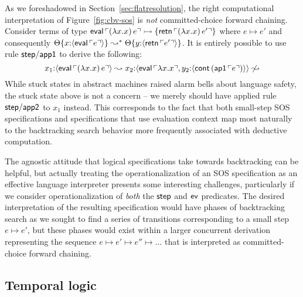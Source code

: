 As we
foreshadowed in Section~\ref{sec:flatresolution}, the right
computational interpretation of Figure~\ref{fig:cbv-sos} is {\it not}
committed-choice forward chaining. Consider terms of type ${\sf
  eval}\,{\ulcorner{(\lambda x.x)\,e}\urcorner} \rightarrowtail \{ {\sf
  retn}\,{\ulcorner{(\lambda x.x)\,e'}\urcorner} \}$ where $e \mapsto e'$ and
consequently ${\Theta}\{{x{:}\langle {{\sf eval}\,{\ulcorner{e}\urcorner}} \rangle}\}
\leadsto^* {\Theta}\{{y{:}\langle {{\sf retn}\,{\ulcorner{e'}\urcorner}} \rangle}\}$.
It is entirely possible to use rule ${\sf step/app1}$ to
derive the following:
\[
  x_1{:}\langle {{\sf eval}\,{\ulcorner{(\lambda x.x)\,e}\urcorner}} \rangle
   \leadsto
  x_2{:}\langle {{\sf eval}\,{\ulcorner{\lambda x.x}\urcorner},
  y_2{:}\langle {{\sf cont}\,({\sf ap1}\,{\ulcorner{e}\urcorner})} \rangle} \rangle
   \not\leadsto
\]
While stuck states in abstract machines raised alarm bells about
language safety, the stuck state above is not a concern -- we merely
should have applied rule ${\sf step/app2}$ to $x_1$ instead. This
corresponds to the fact that both small-step SOS specifications and
specifications that use evaluation context 
map most naturally to the backtracking
search behavior more frequently associated with deductive computation. 

The agnostic attitude that logical specifications take towards
backtracking can be helpful, but actually treating the
operationalization of an SOS specification as an effective language
interpreter presents some interesting challenges, particularly if we
consider operationalization of {\it both} the ${\sf step}$ and ${\sf
  ev}$ predicates. The desired interpretation of the resulting
specification would have phases of backtracking search as we sought to
find a series of transitions corresponding to a small step $e \mapsto
e'$, but these phases would exist within a larger concurrent
derivation representing the sequence $e \mapsto e' \mapsto e'' \mapsto
\ldots$ that is interpreted as committed-choice forward chaining.

\subsection{Temporal logic}

